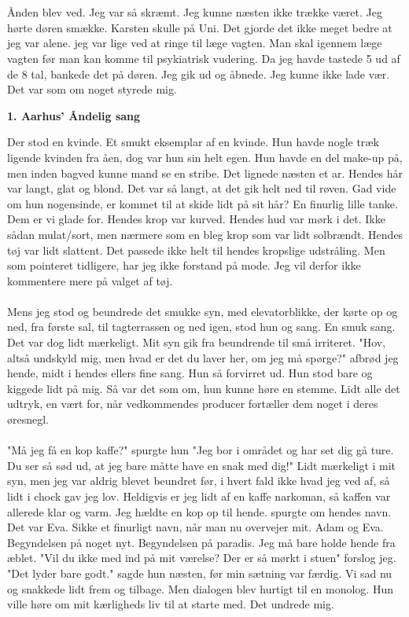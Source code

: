 \documentclass[]{article}
\begin{document}
\\ \\
Ånden blev ved. Jeg var så skræmt. Jeg kunne næsten ikke trække været. Jeg hørte døren smække. Karsten skulle på Uni. Det gjorde det ikke meget bedre at jeg var alene. jeg var lige ved at ringe til læge vagten. Man skal igennem læge vagten før man kan komme til psykiatrisk vudering. Da jeg havde tastede 5 ud af de 8 tal, bankede det på døren. Jeg gik ud og åbnede. Jeg kunne ikke lade vær. Det var som om noget styrede mig.

\begin{center}
	\large\textbf{1. Aarhus' Åndelig sang}
\end{center}

Der stod en kvinde. Et smukt eksemplar af en kvinde. Hun havde nogle træk ligende kvinden fra åen, dog var hun sin helt egen. Hun havde en del make-up på, men inden bagved kunne mand se en stribe. Det lignede næsten et ar. Hendes hår var langt, glat og blond. Det var så langt, at det gik helt ned til røven. Gad vide om hun nogensinde, er kommet til at skide lidt på sit hår? En finurlig lille tanke. Dem er vi glade for. Hendes krop var kurved. Hendes hud var mørk i det. Ikke sådan mulat/sort, men nærmere som en bleg krop som var lidt solbrændt. Hendes tøj var lidt slattent. Det passede ikke helt til hendes kropslige udstråling. Men som pointeret tidligere, har jeg ikke forstand på mode. Jeg vil derfor ikke kommentere mere på valget af tøj.
\\ \\
Mens jeg stod og beundrede det smukke syn, med elevatorblikke, der kørte op og ned, fra første sal, til tagterrassen og ned igen, stod hun og sang. En smuk sang. Det var dog lidt mærkeligt. Mit syn gik fra beundrende til små irriteret. "Hov, altså undskyld mig, men hvad er det du laver her, om jeg må spørge?" afbrød jeg hende, midt i hendes ellers fine sang. Hun så forvirret ud. Hun stod bare og kiggede lidt på mig. Så var det som om, hun kunne høre en stemme. Lidt alle det udtryk, en vært for, når vedkommendes producer fortæller dem noget i deres øresnegl.
\\ \\
"Må jeg få en kop kaffe?" spurgte hun "Jeg bor i området og har set dig gå ture. Du ser så sød ud, at jeg bare måtte have en snak med dig!" Lidt mærkeligt i mit syn, men jeg var aldrig blevet beundret før, i hvert fald ikke hvad jeg ved af, så lidt i chock gav jeg lov. Heldigvis er jeg lidt af en kaffe narkoman, så kaffen var allerede klar og varm. Jeg hældte en kop op til hende. spurgte om hendes navn. Det var Eva. Sikke et finurligt navn, når man nu overvejer mit. Adam og Eva. Begyndelsen på noget nyt. Begyndelsen på paradis. Jeg må bare holde hende fra æblet. "Vil du ikke med ind på mit værelse? Der er så mørkt i stuen" forslog jeg. "Det lyder bare godt." sagde hun næsten, før min sætning var færdig. Vi sad nu og snakkede lidt frem og tilbage. Men dialogen blev hurtigt til en monolog. Hun ville høre om mit kærligheds liv til at starte med. Det undrede mig.
\end{document}
